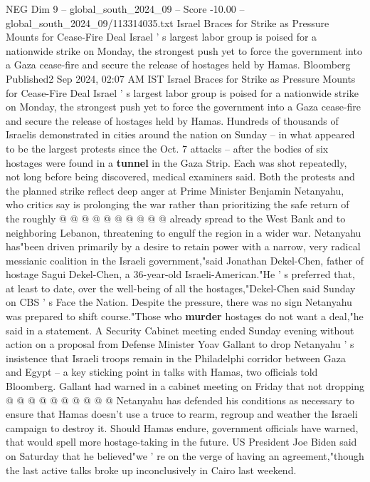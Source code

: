 \begin{textsample}{NEG Dim 9 – global\_south\_2024\_09 – Score -10.00 – global\_south\_2024\_09/113314035.txt}  \label{ex:f9_neg_101}
Israel Braces for Strike as Pressure Mounts for Cease-Fire Deal Israel ' s largest labor group is poised for a nationwide strike on Monday, the strongest push yet to force the government into a Gaza cease-fire and secure the release of hostages held by Hamas.
Bloomberg Published2 Sep 2024, 02:07 AM IST Israel Braces for Strike as Pressure Mounts for Cease-Fire Deal Israel ' s largest labor group is poised for a nationwide strike on Monday, the strongest push yet to force the government into a Gaza cease-fire and secure the release of hostages held by Hamas.
Hundreds of thousands of Israelis demonstrated in cities around the nation on Sunday -- in what appeared to be the largest protests since the Oct. 7 attacks -- after the bodies of six hostages were found in a \textbf{tunnel} in the Gaza Strip.
Each was shot repeatedly, not long before being discovered, medical examiners said.
Both the protests and the planned strike reflect deep anger at Prime Minister Benjamin Netanyahu, who critics say is prolonging the war rather than prioritizing the safe return of the roughly @ @ @ @ @ @ @ @ @ @ already spread to the West Bank and to neighboring Lebanon, threatening to engulf the region in a wider war.
Netanyahu has"been driven primarily by a desire to retain power with a narrow, very radical messianic coalition in the Israeli government,"said Jonathan Dekel-Chen, father of hostage Sagui Dekel-Chen, a 36-year-old Israeli-American."He ' s preferred that, at least to date, over the well-being of all the hostages,"Dekel-Chen said Sunday on CBS ' s Face the Nation.
Despite the pressure, there was no sign Netanyahu was prepared to shift course."Those who \textbf{murder} hostages do not want a deal,"he said in a statement.
A Security Cabinet meeting ended Sunday evening without action on a proposal from Defense Minister Yoav Gallant to drop Netanyahu ' s insistence that Israeli troops remain in the Philadelphi corridor between Gaza and Egypt -- a key sticking point in talks with Hamas, two officials told Bloomberg.
Gallant had warned in a cabinet meeting on Friday that not dropping @ @ @ @ @ @ @ @ @ @ Netanyahu has defended his conditions as necessary to ensure that Hamas doesn't use a truce to rearm, regroup and weather the Israeli campaign to destroy it.
Should Hamas endure, government officials have warned, that would spell more hostage-taking in the future.
US President Joe Biden said on Saturday that he believed"we ' re on the verge of having an agreement,"though the last active talks broke up inconclusively in Cairo last weekend.

\end{textsample}
